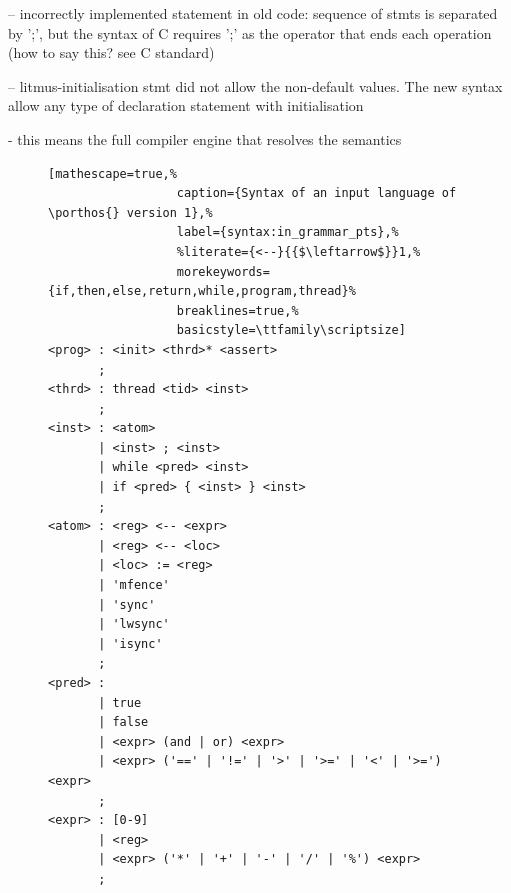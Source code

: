     -- incorrectly implemented statement in old code: sequence of stmts is separated by ';', but the syntax of C requires ';' as the operator that ends each operation (how to say this? see C standard)

    -- litmus-initialisation  stmt did not allow the non-default values. The new syntax allow any type of declaration statement with initialisation

- this means the full compiler engine that resolves the semantics





\begin{figure}%
\begin{lstlisting}[mathescape=true,%
                  caption={Syntax of an input language of \porthos{} version 1},%
                  label={syntax:in_grammar_pts},%
                  %literate={<--}{{$\leftarrow$}}1,%
                  morekeywords={if,then,else,return,while,program,thread}%
                  breaklines=true,%
                  basicstyle=\ttfamily\scriptsize]
<prog> : <init> <thrd>* <assert>
       ;
<thrd> : thread <tid> <inst>
       ;
<inst> : <atom>
       | <inst> ; <inst>
       | while <pred> <inst>
       | if <pred> { <inst> } <inst>
       ;
<atom> : <reg> <-- <expr>
       | <reg> <-- <loc>
       | <loc> := <reg>
       | 'mfence'
       | 'sync'
       | 'lwsync'
       | 'isync'
       ;
<pred> :
       | true
       | false
       | <expr> (and | or) <expr>
       | <expr> ('==' | '!=' | '>' | '>=' | '<' | '>=') <expr>
       ;
<expr> : [0-9]
       | <reg>
       | <expr> ('*' | '+' | '-' | '/' | '%') <expr>
       ;
\end{lstlisting}
\end{figure}


